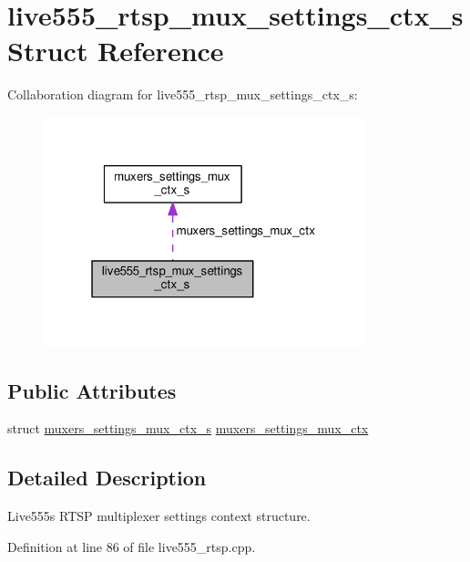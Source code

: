 \hypertarget{structlive555__rtsp__mux__settings__ctx__s}{}\section{live555\+\_\+rtsp\+\_\+mux\+\_\+settings\+\_\+ctx\+\_\+s Struct Reference}
\label{structlive555__rtsp__mux__settings__ctx__s}


Collaboration diagram for live555\+\_\+rtsp\+\_\+mux\+\_\+settings\+\_\+ctx\+\_\+s\+:\nopagebreak
\begin{figure}[H]
\begin{center}
\leavevmode
\includegraphics[width=265pt]{structlive555__rtsp__mux__settings__ctx__s__coll__graph}
\end{center}
\end{figure}
\subsection*{Public Attributes}
\begin{DoxyCompactItemize}
\item 
struct \hyperlink{structmuxers__settings__mux__ctx__s}{muxers\+\_\+settings\+\_\+mux\+\_\+ctx\+\_\+s} \hyperlink{structlive555__rtsp__mux__settings__ctx__s_ab882e923aec197102778eaa816fa940b}{muxers\+\_\+settings\+\_\+mux\+\_\+ctx}
\end{DoxyCompactItemize}


\subsection{Detailed Description}
Live555\textquotesingle{}s R\+T\+SP multiplexer settings context structure. 

Definition at line 86 of file live555\+\_\+rtsp.\+cpp.



